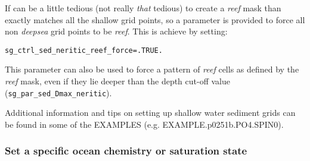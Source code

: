 \documentclass[11pt,fleqn]{book} %
\begin{document}
If can be a little tedious (not really \textit{that} tedious) to create a \textit{reef} mask than exactly matches
all the shallow grid points, so a parameter is provided to force all non \textit{deepsea} grid points to be \textit{reef}. This is achieve by setting:
\vspace{-1mm}\begin{verbatim}
sg_ctrl_sed_neritic_reef_force=.TRUE.
\end{verbatim}\vspace{-1mm}
This parameter can also be used to force a pattern of \textit{reef} cells as defined by the \textit{reef} mask, even if they lie deeper than the depth cut-off value (\texttt{sg\_par\_sed\_Dmax\_neritic}).

Additional information and tips on setting up shallow water sediment grids can be found in some of the EXAMPLES (e.g. \textsf{\footnotesize EXAMPLE.p0251b.PO4.SPIN0}).

%
\newpage
\subsubsection{Set a specific ocean chemistry or saturation state}\label{set_saturation}
\end{document}
